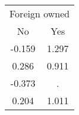 \begin{tabular}{cc}
\toprule
\multicolumn{2}{c}{Foreign owned} \\
\cmidrule(lr){1-2}
No & Yes \\
\midrule
-0.159 & 1.297 \\
0.286 & 0.911 \\
-0.373 & . \\
0.204 & 1.011 \\
\bottomrule
\end{tabular}
